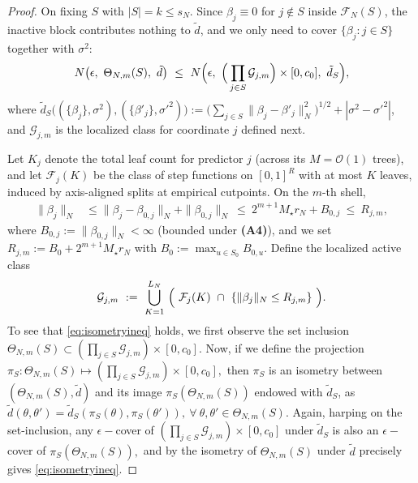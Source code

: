 \documentclass[11pt]{article}
\theoremstyle{plain}
\theoremstyle{definition}
\theoremstyle{plain}
\begin{document}
\begin{proof}
On fixing $S$ with $|S|=k\le s_N$. Since $\beta_j\equiv 0$ for $j\notin S$ inside $\mathcal F_N(S)$, the inactive block contributes nothing to $\tilde d$, and we only need to cover $\{\beta_j:j\in S\}$ together with $\sigma^2$:
\begin{equation}\label{eq:isometryineq}
N\bigl(\epsilon,\ \Theta_{N,m}(S),\ \tilde d\bigr)\ \le\
N\Bigl(\epsilon,\ \Big(\prod_{j\in S}\mathcal G_{j,m}\Bigr)\times[0,c_0],\ \tilde d_S\Bigr),
\end{equation}
where $\tilde d_S\bigl((\{\beta_j\},\sigma^2),(\{\beta'_j\},{\sigma'}^2)\bigr):=\big(\sum_{j\in S}\|\beta_j-\beta'_j\|_N^2\big)^{1/2}+|\sigma^2-{\sigma'}^2|$, and $\mathcal G_{j,m}$ is the localized class for coordinate $j$ defined next.

Let $K_j$ denote the total leaf count for predictor $j$ (across its $M=\mathcal{O}(1)$ trees), and let $\mathcal F_j(K)$ be the class of step functions on $[0,1]^R$ with at most $K$ leaves, induced by axis-aligned splits at empirical cutpoints. On the $m$-th shell,
\begin{align*}
\|\beta_j\|_N
&\le \|\beta_j-\beta_{0,j}\|_N+\|\beta_{0,j}\|_N
\ \le\ 2^{m+1}M_\star r_N + B_{0,j}
\ \le\ R_{j,m},
\end{align*}
where $B_{0,j}:=\|\beta_{0,j}\|_N<\infty$ (bounded under \textbf{(A4)}), and we set $R_{j,m}:=B_0+2^{m+1}M_\star r_N$ with $B_0:=\max_{u\in S_0}B_{0,u}$. Define the localized active class
\begin{equation*}
\mathcal G_{j,m}\ :=\ \bigcup_{K=1}^{L_N}\ \Bigl(\ \mathcal F_j(K)\ \cap\ \{\|\beta_j\|_N\le R_{j,m}\}\ \Bigr).
\end{equation*}
To see that \eqref{eq:isometryineq} holds, we first observe the set inclusion $\Theta_{N,m}(S) \subset \left(\prod_{j \in S} \mathcal{G}_{j,m} \right) \times [0,c_0].$ Now, if we define the projection $\pi_S : \Theta_{N,m}(S) \mapsto \left( \prod_{j \in S} \mathcal{G}_{j,m} \right) \times [0,c_0],$ then $\pi_S$ is an isometry between $(\Theta_{N,m}(S),\tilde{d})$ and its image $\pi_S(\Theta_{N,m}(S))$ endowed with $\tilde{d}_S$, as $\tilde{d}(\theta,\theta')=\tilde{d}_S(\pi_S (\theta),\pi_S (\theta')), \ \forall \ \theta,\theta' \in \Theta_{N,m}(S).$ Again, harping on the set-inclusion, any $\epsilon-$cover of $\left(\prod_{j \in S} \mathcal{G}_{j,m}\right) \times [0,c_0]$ under $\tilde{d}_S$ is also an $\epsilon-$cover of $\pi_S(\Theta_{N,m}(S)),$ and by the isometry of $\Theta_{N,m}(S)$ under $\tilde{d}$ precisely gives \eqref{eq:isometryineq}.


\end{proof}
\end{document}

